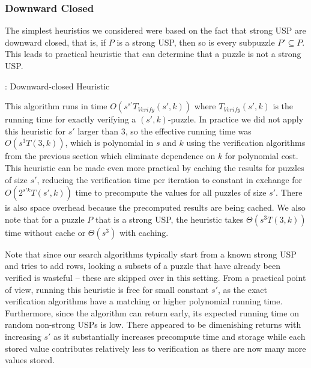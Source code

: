 \documentclass[11pt]{article}
\newcommand\sse{\subseteq}
\begin{document}
\subsubsection{Downward Closed}

The simplest heuristics we considered were based on the fact that
strong USP are downward closed, that is, if $P$ is a strong USP, then
so is every subpuzzle $P' \sse P$.  This leads to practical heuristic
that can determine that a puzzle is not a strong USP.

\begin{algorithm}
  \caption{: Downward-closed Heuristic}
  \label{alg:downward-closed}
\begin{algorithmic}[1]
  \For{$P' \sse P, |P'| = s'$}
        \EndIf
  \EndFor{}
  \EndFunction
\end{algorithmic}
\end{algorithm}

This algorithm runs in time $O(s^{s'} T_{Verify}(s', k))$ where
$T_{Verify}(s',k)$ is the running time for exactly verifying a
$(s',k)$-puzzle.  In practice we did not apply this heuristic for $s'$
larger than $3$, so the effective running time was $O(s^3 T(3,k))$,
which is polynomial in $s$ and $k$ using the verification algorithms
from the previous section which eliminate dependence on $k$ for
polynomial cost.  This heuristic can be made even more practical by
caching the results for puzzles of size $s'$, reducing the
verification time per iteration to constant in exchange for
$O(2^{s'k}T(s',k))$ time to precompute the values for all puzzles of
size $s'$.  There is also space overhead because the precomputed
results are being cached.  We also note that for a puzzle $P$ that is
a strong USP, the heuristic takes $\Theta(s^3 T(3,k))$ time without
cache or $\Theta(s^3)$ with caching.

Note that since our search algorithms typically start from a known
strong USP and tries to add rows, looking a subsets of a puzzle that
have already been verified is wasteful -- these are skipped over in
this setting.  From a practical point of view, running this heuristic
is free for small constant $s'$, as the exact verification algorithms
have a matching or higher polynomial running time.  Furthermore, since
the algorithm can return early, its expected running time on random
non-strong USPs is low.  There appeared to be dimenishing returns with
increasing $s'$ as it substantially increases precompute time and
storage while each stored value contributes relatively less to
verification as there are now many more values stored.
\end{document}
